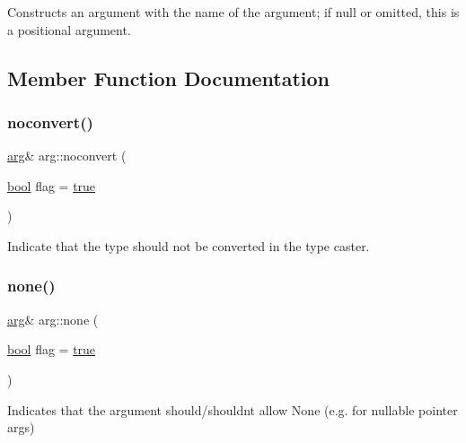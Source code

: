 Constructs an argument with the name of the argument; if null or omitted, this is a positional argument. 



\subsection{Member Function Documentation}
\mbox{\label{structarg_affdcf2c99a2f27cb539efd6853335d4b}} 
\subsubsection{\texorpdfstring{noconvert()}{noconvert()}}
{\footnotesize\ttfamily \mbox{\hyperlink{structarg}{arg}}\& arg\+::noconvert (\begin{DoxyParamCaption}\item[{\mbox{\hyperlink{asdl_8h_af6a258d8f3ee5206d682d799316314b1}{bool}}}]{flag = {\ttfamily \mbox{\hyperlink{asdl_8h_af6a258d8f3ee5206d682d799316314b1a08f175a5505a10b9ed657defeb050e4b}{true}}} }\end{DoxyParamCaption})\hspace{0.3cm}{\ttfamily [inline]}}



Indicate that the type should not be converted in the type caster. 

\mbox{\label{structarg_a99082d77a1a365593a16939f03194e5e}} 
\subsubsection{\texorpdfstring{none()}{none()}}
{\footnotesize\ttfamily \mbox{\hyperlink{structarg}{arg}}\& arg\+::none (\begin{DoxyParamCaption}\item[{\mbox{\hyperlink{asdl_8h_af6a258d8f3ee5206d682d799316314b1}{bool}}}]{flag = {\ttfamily \mbox{\hyperlink{asdl_8h_af6a258d8f3ee5206d682d799316314b1a08f175a5505a10b9ed657defeb050e4b}{true}}} }\end{DoxyParamCaption})\hspace{0.3cm}{\ttfamily [inline]}}



Indicates that the argument should/shouldn\textquotesingle{}t allow None (e.\+g. for nullable pointer args) 

